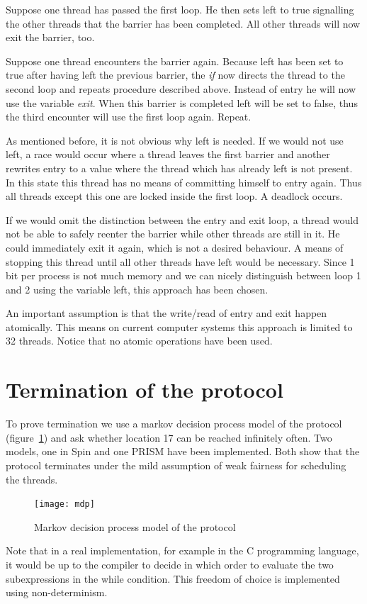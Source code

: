 \documentclass[a4paper, 10pt]{article}
\begin{document}
Suppose one thread has passed the first loop. He then sets left to true signalling the other threads that the barrier has been completed. All other threads will now exit the barrier, too.

Suppose one thread encounters the barrier again. Because left has been set to true after having left the previous barrier, the \emph{if} now directs the thread to the second loop and repeats procedure described above. Instead of entry he will now use the variable \emph{exit}. When this barrier is completed left will be set to false, thus the third encounter will use the first loop again. Repeat.

As mentioned before, it is not obvious why left is needed. If we would not use left, a race would occur where a thread leaves the first barrier and another rewrites entry to a value where the thread which has already left is not present. In this state this thread has no means of committing himself to entry again. Thus all threads except this one are locked inside the first loop. A deadlock occurs.

If we would omit the distinction between the entry and exit loop, a thread would not be able to safely reenter the barrier while other threads are still in it. He could immediately exit it again, which is not a desired behaviour. A means of stopping this thread until all other threads have left would be necessary. Since 1 bit per process is not much memory and we can nicely distinguish between loop 1 and 2 using the variable left, this approach has been chosen.

An important assumption is that the write/read of entry and exit happen atomically. This means on current computer systems this approach is limited to 32 threads. Notice that no atomic operations have been used.

\section{Termination of the protocol}
To prove termination we use a markov decision process model of the protocol (figure~\ref{fig:mdp}) and ask whether location 17 can be reached infinitely often. Two models, one in Spin\cite{spin} and one PRISM\cite{prism} have been implemented. Both show that the protocol terminates under the mild assumption of weak fairness for scheduling the threads.
\begin{figure}[htbp]
	\centering
	\texttt{[image: mdp]}
	\caption{Markov decision process model of the protocol}
	\label{fig:mdp}
\end{figure}
Note that in a real implementation, for example in the C programming language, it would be up to the compiler to decide in which order to evaluate the two subexpressions in the while condition. This freedom of choice is implemented using non-determinism.
\end{document}
